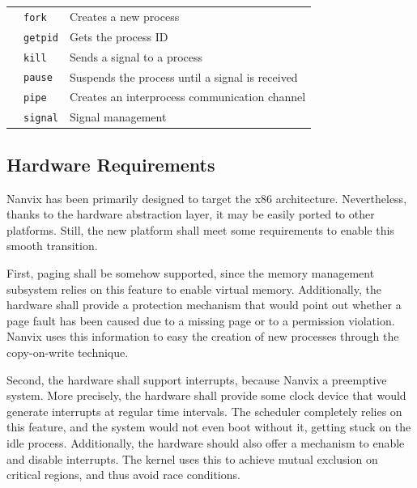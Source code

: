 \documentclass[10pt,a4paper]{article}
\begin{document}
\begin{table}[t]
\begin{tabular}{l l l}
	                                     & \texttt{fork}     & Creates a new process                           \\
	                                     & \texttt{getpid}   & Gets the process ID                             \\
	                                     & \texttt{kill}     & Sends a signal to a process                     \\
	                                     & \texttt{pause}    & Suspends the process until a signal is received \\
	                                     & \texttt{pipe}     & Creates an interprocess communication channel   \\
	                                     & \texttt{signal}   & Signal management                               \\
	\bottomrule
\end{tabular}
\end{table}

\subsection{Hardware Requirements}
\label{section: hardware requirements}

Nanvix has been primarily designed to target the x86 architecture. Nevertheless, thanks to the hardware abstraction layer, it may be easily ported to other platforms. Still, the new platform shall meet some requirements to enable this smooth transition.

First, paging shall be somehow supported, since the memory management subsystem relies on this feature to enable virtual memory. Additionally, the hardware shall provide a protection mechanism that would point out whether a page fault has been caused due to a missing page or to a permission violation. Nanvix uses this information to easy the creation of new processes through the copy-on-write technique.

Second, the hardware shall support interrupts, because Nanvix a preemptive system. More precisely, the hardware shall provide some clock device that would generate interrupts at regular time intervals. The scheduler completely relies on this feature, and the system would not even boot without it, getting stuck on the idle process. Additionally, the hardware should also offer a mechanism to enable and disable interrupts. The kernel uses this to achieve mutual exclusion on critical regions, and thus avoid race conditions.
\end{document}
